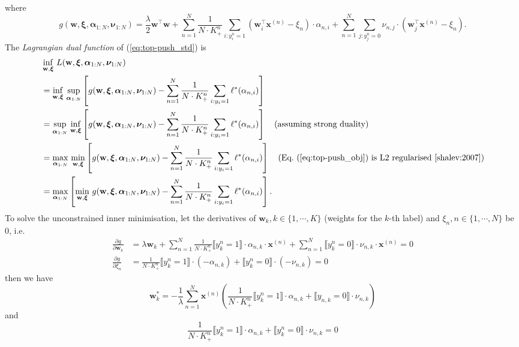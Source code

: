 \documentclass[9pt]{extarticle}
\newcommand{\llb}{\llbracket}
\newcommand{\rrb}{\rrbracket}
\newcommand{\x}{\mathbf{x}}
\newcommand{\1}{\mathbf{1}}
\newcommand{\w}{\mathbf{w}}
\newcommand{\alphabm}{\bm{\alpha}}
\newcommand{\nubm}{\bm{\nu}}
\newcommand{\xibm}{\bm{\xi}}
\newcommand{\pb}[1]{^{({#1})}}
\newcommand{\ie}{i.e.\ }
\begin{document}
where 
\begin{equation*}
g(\w, \xibm, \alphabm_{1:N}, \nubm_{1:N})
= \frac{\lambda}{2} \w^\top \w + \sum_{n=1}^N \frac{1}{N \cdot K_+^n} \sum_{i:y_i^n=1} (\w_i^\top \x\pb{n} - \xi_n) \cdot \alpha_{n,i}  + 
  \sum_{n=1}^N \sum_{j:y_j^n=0} \nu_{n,j} \cdot (\w_j^\top \x\pb{n} - \xi_n).
\end{equation*}
%
The \emph{Lagrangian dual function} of (\ref{eq:top-push_std}) is
\begin{equation}
\label{eq:top-push_dual_func}
\begin{aligned}
&  \inf_{\w, \xibm} \, L(\w, \xibm, \alphabm_{1:N}, \nubm_{1:N}) \\
&= \inf_{\w, \xibm} \, \underset{\alphabm_{1:N}}{\sup} \left[ g(\w, \xibm, \alphabm_{1:N}, \nubm_{1:N}) -
   \sum_{n=1}^N \frac{1}{N \cdot K_+^n} \sum_{i:y_i=1} \ell^*(\alpha_{n,i}) \right] \\
&= \underset{\alphabm_{1:N}}{\sup} \, \inf_{\w, \xibm} \left[ g(\w, \xibm, \alphabm_{1:N}, \nubm_{1:N}) -
   \sum_{n=1}^N \frac{1}{N \cdot K_+^n} \sum_{i:y_i=1} \ell^*(\alpha_{n,i}) \right] \quad \text{(assuming strong duality)} \\
&= \underset{\alphabm_{1:N}}{\max} \, \min_{\w, \xibm} \left[ g(\w, \xibm, \alphabm_{1:N}, \nubm_{1:N}) -
   \sum_{n=1}^N \frac{1}{N \cdot K_+^n} \sum_{i:y_i=1} \ell^*(\alpha_{n,i}) \right] \quad 
   \text{(Eq.~(\ref{eq:top-push_obj}) is L2 regularised~\cite{shalev:2007})} \\
&= \underset{\alphabm_{1:N}}{\max} \left[ \min_{\w, \xibm} \, g(\w, \xibm, \alphabm_{1:N}, \nubm_{1:N}) -
   \sum_{n=1}^N \frac{1}{N \cdot K_+^n} \sum_{i:y_i=1} \ell^*(\alpha_{n,i}) \right].
\end{aligned}
\end{equation}
%
To solve the unconstrained inner minimisation, 
let the derivatives of $\w_k, k \in \{1,\cdots,K\}$ (weights for the $k$-th label) and $\xi_n, n \in \{1,\cdots,N\}$ be 0, \ie
\begin{align*}
\frac{\partial g}{\partial \w_k}
&= \lambda \w_k + \sum_{n=1}^N \frac{1}{N \cdot K_+^n} \llb y_k^n = 1 \rrb \cdot \alpha_{n,k} \cdot \x\pb{n} + 
   \sum_{n=1}^N \llb y_k^n = 0 \rrb \cdot \nu_{n,k} \cdot \x\pb{n} = 0 \\
\frac{\partial g}{\partial \xi_n} 
&= \frac{1}{N \cdot K_+^n} \llb y_k^n = 1 \rrb \cdot (-\alpha_{n,k}) + \llb y_k^n = 0 \rrb \cdot (-\nu_{n,k}) = 0
\end{align*}
then we have 
\begin{equation}
\label{eq:sol_part1}
\w_k^* = -\frac{1}{\lambda} \sum_{n=1}^N \x\pb{n} 
         \left( \frac{1}{N \cdot K_+^n} \llb y_k^n = 1 \rrb \cdot \alpha_{n,k} + \llb y_{n,k} = 0 \rrb \cdot \nu_{n,k} \right)
\end{equation}
and
\begin{equation}
\label{eq:sol_part2}
\frac{1}{N \cdot K_+^n} \llb y_k^n = 1 \rrb \cdot \alpha_{n,k} + \llb y_k^n = 0 \rrb \cdot \nu_{n,k} = 0
\end{equation}
\end{document}
